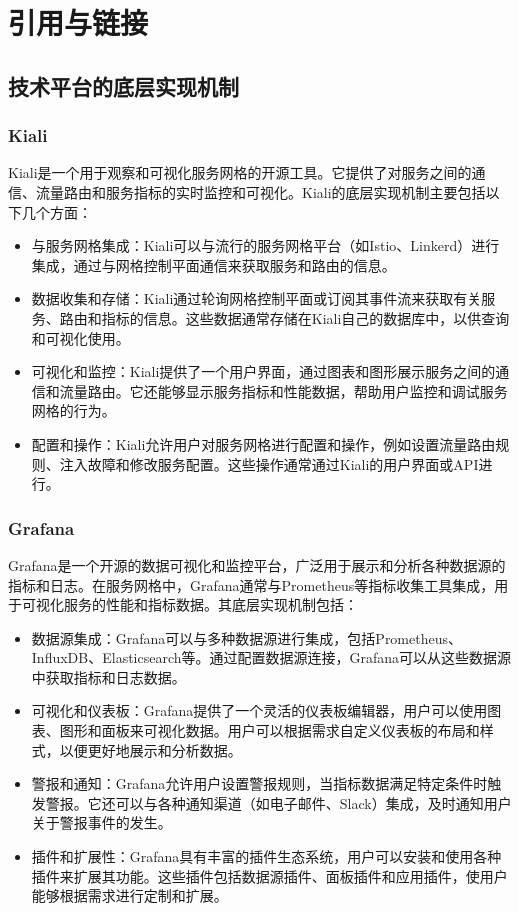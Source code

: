 \chapter{引用与链接}\label{cha:ref}
\section{技术平台的底层实现机制}

\subsection{Kiali}

Kiali是一个用于观察和可视化服务网格的开源工具。它提供了对服务之间的通信、流量路由和服务指标的实时监控和可视化。Kiali的底层实现机制主要包括以下几个方面：

\begin{itemize}
	\item 与服务网格集成：Kiali可以与流行的服务网格平台（如Istio、Linkerd）进行集成，通过与网格控制平面通信来获取服务和路由的信息。
	\item 数据收集和存储：Kiali通过轮询网格控制平面或订阅其事件流来获取有关服务、路由和指标的信息。这些数据通常存储在Kiali自己的数据库中，以供查询和可视化使用。
	\item 可视化和监控：Kiali提供了一个用户界面，通过图表和图形展示服务之间的通信和流量路由。它还能够显示服务指标和性能数据，帮助用户监控和调试服务网格的行为。
	\item 配置和操作：Kiali允许用户对服务网格进行配置和操作，例如设置流量路由规则、注入故障和修改服务配置。这些操作通常通过Kiali的用户界面或API进行。
\end{itemize}

\subsection{Grafana}

Grafana是一个开源的数据可视化和监控平台，广泛用于展示和分析各种数据源的指标和日志。在服务网格中，Grafana通常与Prometheus等指标收集工具集成，用于可视化服务的性能和指标数据。其底层实现机制包括：

\begin{itemize}
	\item 数据源集成：Grafana可以与多种数据源进行集成，包括Prometheus、InfluxDB、Elasticsearch等。通过配置数据源连接，Grafana可以从这些数据源中获取指标和日志数据。
	\item 可视化和仪表板：Grafana提供了一个灵活的仪表板编辑器，用户可以使用图表、图形和面板来可视化数据。用户可以根据需求自定义仪表板的布局和样式，以便更好地展示和分析数据。
	\item 警报和通知：Grafana允许用户设置警报规则，当指标数据满足特定条件时触发警报。它还可以与各种通知渠道（如电子邮件、Slack）集成，及时通知用户关于警报事件的发生。
	\item 插件和扩展性：Grafana具有丰富的插件生态系统，用户可以安装和使用各种插件来扩展其功能。这些插件包括数据源插件、面板插件和应用插件，使用户能够根据需求进行定制和扩展。
\end{itemize}

